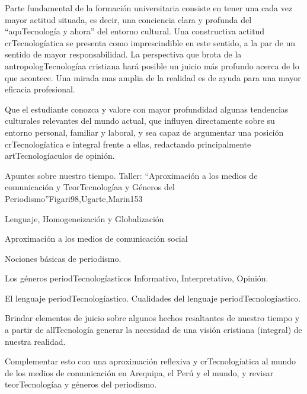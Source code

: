 \begin{syllabus}


\begin{justification}
Parte fundamental de la formación universitaria consiste en tener una cada vez mayor actitud situada, es decir, una conciencia clara y profunda del ``aquTecnología y ahora'' del entorno cultural.  Una constructiva actitud crTecnologíatica se presenta como imprescindible en este sentido, a la par de un sentido de mayor responsabilidad.  La perspectiva que brota de la antropologTecnologíaa cristiana hará posible un juicio más profundo acerca de lo que acontece.  Una mirada mas amplia de la realidad es de ayuda para una mayor eficacia profesional.
\end{justification}

\begin{goals}
\item Que el estudiante conozca y valore con mayor profundidad algunas tendencias culturales relevantes del mundo actual, que influyen directamente sobre su entorno personal, familiar y laboral, y sea capaz de argumentar una posición crTecnologíatica e integral frente a ellas, redactando principalmente artTecnologíaculos de opinión.
\end{goals}

\begin{outcomes}
\end{outcomes}

\begin{unit}{Apuntes sobre nuestro tiempo. Taller: ``Aproximación a los medios de comunicación y TeorTecnologíaa y Géneros del Periodismo''}{Figari98,Ugarte,Marin}{15}{3}
\begin{topics}
	\item Lenguaje, Homogeneización y Globalización
	\item Aproximación a los medios de comunicación social
	\item Nociones básicas de periodismo.
	\item Los géneros periodTecnologíasticos Informativo, Interpretativo, Opinión.
	\item El lenguaje periodTecnologíastico. Cualidades del lenguaje periodTecnologíastico.
\end{topics}
\begin{unitgoals}
	\item Brindar elementos de juicio sobre algunos hechos resaltantes de nuestro tiempo y a partir de allTecnología generar la necesidad de una visión cristiana (integral) de nuestra realidad. 	
	\item Complementar esto con una aproximación reflexiva y crTecnologíatica al mundo de los medios de comunicación en Arequipa, el Perú y el mundo, y revisar teorTecnologíaa y géneros del periodismo.
\end{unitgoals}
\end{unit}


\end{syllabus}
